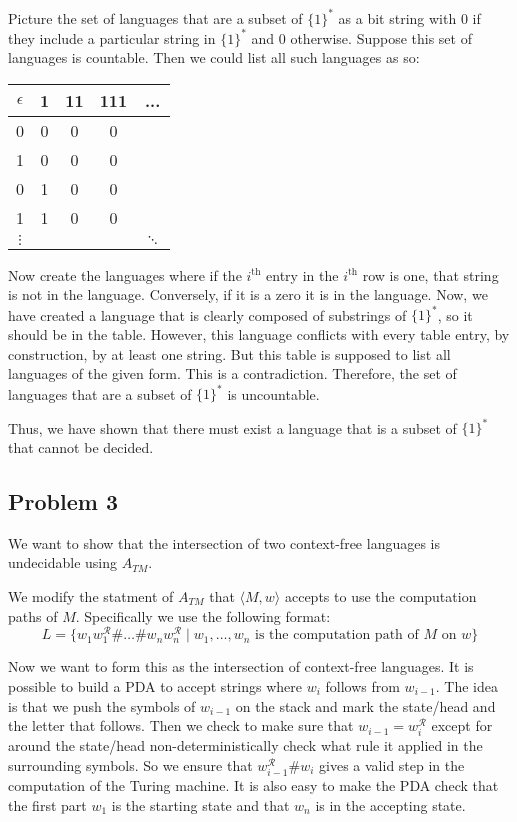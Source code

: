 \documentclass[english]{article}
\begin{document}
Picture the set of languages that are a subset of $\{1\}^*$ as a bit string with 0 if they include
a particular string in $\{1\}^*$ and 0 otherwise. Suppose this set of languages is countable.
Then we could list all such languages as so:\\

\begin{tabular}{c|c|c|c|c}
	$\epsilon$ & 1 & 11 & 111 & ... \\ \hline
	0 & 0 & 0 & 0 & \\ \hline
	1 & 0 & 0 & 0 & \\ \hline
	0 & 1 & 0 & 0 & \\ \hline
	1 & 1 & 0 & 0 & \\ \hline
	$\vdots$ &&&& $\ddots$ \\
\end{tabular}

Now create the languages where if the $i^{\text{th}}$ entry in the $i^{\text{th}}$ row
is one, that string is not in the language. Conversely, if it is a zero it is in the language.
Now, we have created a language that is clearly composed of substrings of $\{1\}^*$, so it
should be in the table. However, this language conflicts with every table entry, by construction,
by at least one string. But this table is supposed to list all languages of the given form.
This is a contradiction. Therefore, the set of languages that are a subset of $\{1\}^*$
is uncountable.

Thus, we have shown that there must exist a language that is a subset of $\{1\}^*$ that cannot
be decided.

\subsection*{Problem 3}
We want to show that the intersection of two context-free languages is
undecidable using $A_{TM}$. 

We modify the statment of $A_{TM}$ that $\langle M,w \rangle$ accepts to use
the computation paths of $M$. Specifically we use the following format:
\begin{equation*}
L = \{ w_1 w_1^\mathcal{R} \#  \ldots \# w_n w_n^\mathcal{R} \mid
        w_1, \ldots, w_n \textrm{ is the computation path of $M$ on $w$} \}
\end{equation*}

Now we want to form this as the intersection of context-free languages. It
is possible to build a PDA to accept strings where $w_i$ follows from
$w_{i-1}$. The idea is that we push the symbols of $w_{i-1}$ on the stack and
mark the state/head and the letter that follows. Then we check to make sure
that $ w_{i-1} = w_i^\mathcal{R}$ except for around the state/head
non-deterministically check what rule it applied in the surrounding symbols.
So we ensure that $w_{i-1}^\mathcal{R} \# w_{i}$ gives a valid step in the
computation of the Turing machine. It is also easy to make the PDA check that
the first part $w_1$ is the starting state and that $w_n$ is in the accepting
state.
\end{document}
